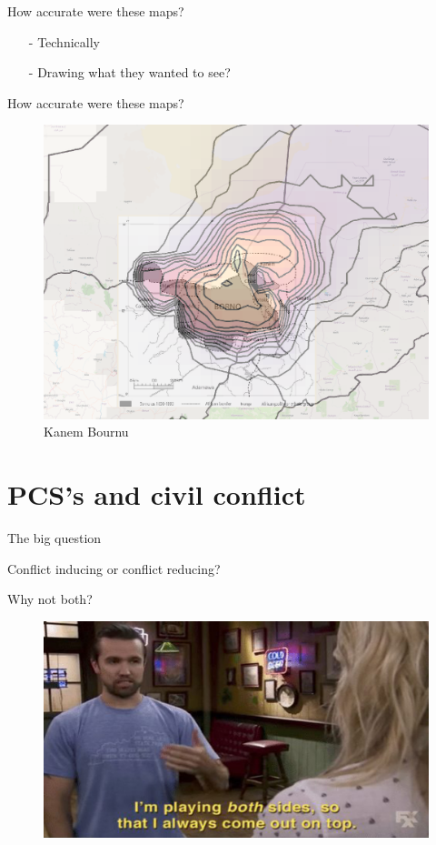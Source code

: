 \documentclass{beamer}
\begin{document}
\begin{frame}{How accurate were these maps?}
		\begin{itemize}
			\item[-] Technically \pause %
			\item[-] Drawing what they wanted to see?
		\end{itemize}
\end{frame}

\begin{frame}{How accurate were these maps?}

	\begin{figure}[htpb]
		\centering
		\includegraphics[width=0.8\linewidth]{img/kanem_bornu_hist.png}
		\caption{Kanem Bournu}
	\end{figure}

\end{frame}


\section{PCS's and civil conflict}

\begin{frame}{The big question}

Conflict inducing or conflict reducing?	

\end{frame}

\begin{frame}{Why not both?}

	\begin{figure}[htpb]
		\centering
		\includegraphics[width=0.8\linewidth]{img/bothsides.jpg}
	\end{figure}

\end{frame}
\end{document}
